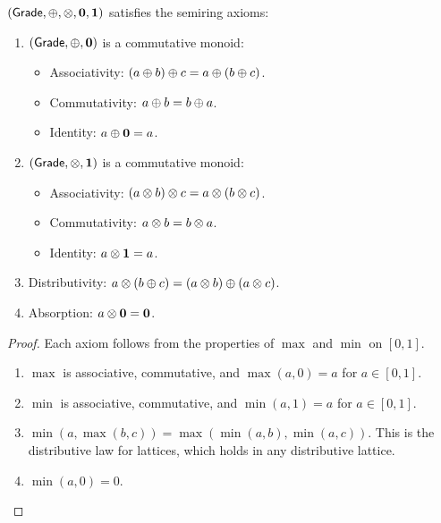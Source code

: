 \begin{proposition}
\label{prop:semiring-axioms}
$(\mathsf{Grade}, \oplus, \otimes, \mathbf{0}, \mathbf{1})$ satisfies the semiring axioms:
\begin{enumerate}
\item $(\mathsf{Grade}, \oplus, \mathbf{0})$ is a commutative monoid:
  \begin{itemize}[nosep]
  \item Associativity: $(a \oplus b) \oplus c = a \oplus (b \oplus c)$.
  \item Commutativity: $a \oplus b = b \oplus a$.
  \item Identity: $a \oplus \mathbf{0} = a$.
  \end{itemize}

\item $(\mathsf{Grade}, \otimes, \mathbf{1})$ is a commutative monoid:
  \begin{itemize}[nosep]
  \item Associativity: $(a \otimes b) \otimes c = a \otimes (b \otimes c)$.
  \item Commutativity: $a \otimes b = b \otimes a$.
  \item Identity: $a \otimes \mathbf{1} = a$.
  \end{itemize}

\item Distributivity: $a \otimes (b \oplus c) = (a \otimes b) \oplus (a \otimes c)$.

\item Absorption: $a \otimes \mathbf{0} = \mathbf{0}$.
\end{enumerate}
\end{proposition}

\begin{proof}
Each axiom follows from the properties of $\max$ and $\min$ on $[0,1]$.
\begin{enumerate}
\item $\max$ is associative, commutative, and $\max(a, 0) = a$ for
  $a \in [0,1]$.

\item $\min$ is associative, commutative, and $\min(a, 1) = a$ for
  $a \in [0,1]$.

\item $\min(a, \max(b, c)) = \max(\min(a, b), \min(a, c))$.
  This is the distributive law for lattices, which holds in any
  distributive lattice.

\item $\min(a, 0) = 0$.  \qedhere
\end{enumerate}
\end{proof}


